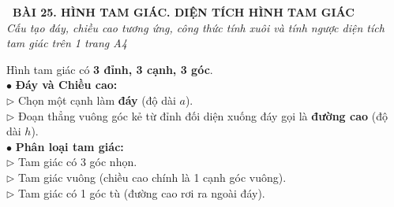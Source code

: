 \documentclass[14pt,a4paper,oneside]{extbook}
\begin{document}
\noindent
\begin{tcolorbox}[
  enhanced,
  colback=teal!8!white,
  colframe=teal!80!black,
  arc=3mm,
  boxrule=1.1pt,
  width=\linewidth,
  halign=center,
  top=2.2mm, bottom=2.2mm,
  left=3mm, right=3mm,
  drop fuzzy shadow
]
  {\large\bfseries\color{teal!95!black}\faBookmark\ BÀI 25. HÌNH TAM GIÁC. DIỆN TÍCH HÌNH TAM GIÁC}\\[2pt]
  {\scriptsize\color{black!75}\itshape Cấu tạo đáy, chiều cao tương ứng, công thức tính xuôi và tính ngược diện tích tam giác trên 1 trang A4}
\end{tcolorbox}

\vspace{3.2mm}
\noindent
\begin{minipage}[t]{0.56\textwidth}
  \begin{tcolorbox}[
    enhanced,
    title={\footnotesize\bfseries\color{white}\faKey\ 1. Các yếu tố của hình tam giác},
    colback=blue!2!white,
    colframe=blue!75!black,
    arc=2.5mm, boxrule=0.8pt, top=1.8mm, bottom=1.8mm, left=2.2mm, right=2.2mm
  ]
    \footnotesize
    Hình tam giác có \textbf{3 đỉnh, 3 cạnh, 3 góc}.\\
    $\bullet$ \textbf{Đáy và Chiều cao:}\\
    $\triangleright$ Chọn một cạnh làm \textbf{đáy} (độ dài $a$).\\
    $\triangleright$ Đoạn thẳng vuông góc kẻ từ đỉnh đối diện xuống đáy gọi là \textbf{đường cao} (độ dài $h$).\\
    $\bullet$ \textbf{Phân loại tam giác:}\\
    $\triangleright$ Tam giác có 3 góc nhọn.\\
    $\triangleright$ Tam giác vuông (chiều cao chính là 1 cạnh góc vuông).\\
    $\triangleright$ Tam giác có 1 góc tù (đường cao rơi ra ngoài đáy).
  \end{tcolorbox}
\end{minipage}%
\hfill
\end{document}
